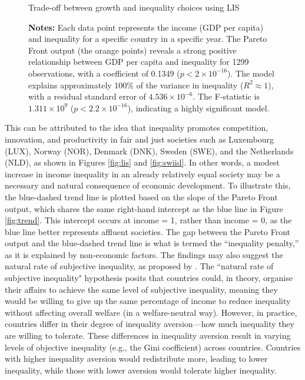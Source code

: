 \documentclass[12pt]{article}
\begin{document}
\begin{figure}[H]
    \centering
    \scalebox{0.6}{}
    \caption{Trade-off between growth and inequality choices using LIS}
    \label{fig:lis}
    \captionsetup{font=footnotesize}
    \caption*{\textbf{Notes:} Each data point represents the income (GDP per capita) and inequality for a specific country in a specific year.  The Pareto Front output (the orange points) reveals a strong positive relationship between GDP per capita and inequality for 1299 observations, with a coefficient of 0.1349 (\( p < 2 \times 10^{-16} \)). The model explains approximately 100\% of the variance in inequality (\( R^2 \approx 1 \)), with a residual standard error of \( 4.536 \times 10^{-6} \). The F-statistic is \( 1.311 \times 10^9 \) (\( p < 2.2 \times 10^{-16} \)), indicating a highly significant model.}
    \label{fig:trade_off}
\end{figure}


This can be attributed to the idea that inequality promotes competition, innovation, and productivity in fair and just societies such as Luxembourg (LUX), Norway (NOR), Denmark (DNK), Sweden (SWE), and the Netherlands (NLD), as shown in Figures \ref{fig:lis} and \ref{fig:swiid}. In other words, a modest increase in income inequality in an already relatively equal society may be a necessary and natural consequence of economic development. To illustrate this, the blue-dashed trend line is plotted based on the slope of the Pareto Front output, which shares the same right-hand intercept as the blue line in Figure \ref{fig:trend}. This intercept occurs at income = 1, rather than income = 0, as the blue line better represents affluent societies. The gap between the Pareto Front output and the blue-dashed trend line is what is termed the ``inequality penalty,'' as it is explained by non-economic factors. The findings may also suggest the natural rate of subjective inequality, as proposed by \textcite{lambert2003inequality}. The ``natural rate of subjective inequality" hypothesis posits that countries could, in theory, organise their affairs to achieve the same level of subjective inequality, meaning they would be willing to give up the same percentage of income to reduce inequality without affecting overall welfare (in a welfare-neutral way). However, in practice, countries differ in their degree of inequality aversion—how much inequality they are willing to tolerate. These differences in inequality aversion result in varying levels of objective inequality (e.g., the Gini coefficient) across countries. Countries with higher inequality aversion would redistribute more, leading to lower inequality, while those with lower aversion would tolerate higher inequality.
\end{document}
